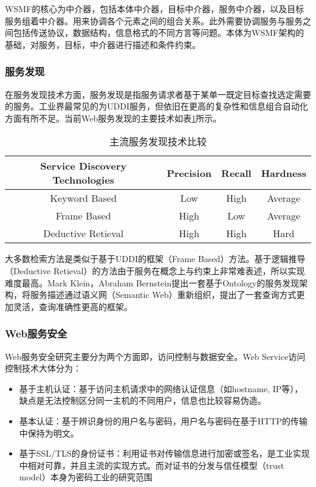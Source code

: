 WSMF的核心为中介器，包括本体中介器，目标中介器，服务中介器，以及目标服务组着中介器。用来协调各个元素之间的组合关系。此外需要协调服务与服务之间包括传送协议，数据结构，信息格式的不同方言等问题。本体为WSMF架构的基础，对服务，目标，中介器进行描述和条件约束。

\subsubsection{服务发现}
在服务发现技术方面，服务发现是指服务请求者基于某单一既定目标查找选定需要的服务。工业界最常见的为UDDI服务，但依旧在更高的复杂性和信息组合自动化方面有所不足。当前Web服务发现的主要技术如表\ref{tab:web-service-discovery}所示。\cite{klein2001serching}

\begin{table}[htb]
  \centering
  \begin{minipage}[t]{0.8\linewidth}
  \caption{主流服务发现技术比较}
  \label{tab:web-service-discovery}
    \begin{tabular}{c	c	c	c}
      \toprule[1pt]
      \textbf{Service Discovery Technologies} & \textbf{Precision} & \textbf{Recall} & \textbf{Hardness} \\\midrule[0.5pt]
      Keyword Based & Low & High & Average\\
      Frame Based & High & Low & Average\\
      Deductive Retieval & High & High & Hard\\
      \bottomrule[1pt]
    \end{tabular}
  \end{minipage}
\end{table}

大多数检索方法是类似于基于UDDI的框架（Frame Based）方法。基于逻辑推导（Deductive Retieval）的方法由于服务在概念上与约束上非常难表述，所以实现难度最高。Mark Klein，Abraham Bernstein提出一套基于Ontology的服务发现架构，将服务描述通过语义网（Semantic Web）重新组织，提出了一套查询方式更加灵活，查询准确性更高的框架。\cite{klein2001serching}

\subsubsection{Web服务安全}
Web服务安全研究主要分为两个方面即，访问控制与数据安全。Web Service访问控制技术大体分为：
\begin{itemize}
\item 基于主机认证：基于访问主机请求中的网络认证信息（如hostname, IP等），缺点是无法控制区分同一主机的不同用户，信息也比较容易伪造。
\item 基本认证：基于辨识身份的用户名与密码，用户名与密码在基于HTTP的传输中保持为明文。
\item 基于SSL/TLS的身份证书：利用证书对传输信息进行加密或签名，是工业实现中相对可靠，并且主流的实现方式。而对证书的分发与信任模型（trust model）本身为密码工业的研究范围
\end{itemize}

